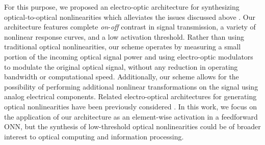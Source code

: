 For this purpose, we proposed an electro-optic architecture for synthesizing optical-to-optical nonlinearities which alleviates the issues discussed above \cite{williamson_reprogrammable_2019}. 
Our architecture features complete \textit{on}-\textit{off} contrast in signal transmission, a variety of nonlinear response curves, and a low activation threshold. 
Rather than using traditional optical nonlinearities, our scheme operates by measuring a small portion of the incoming optical signal power and using electro-optic modulators to modulate the original optical signal, without any reduction in operating bandwidth or computational speed. 
Additionally, our scheme allows for the possibility of performing additional nonlinear transformations on the signal using analog electrical components. 
Related electro-optical architectures for generating optical nonlinearities have been previously considered \cite{lentine_evolution_1993, majumdar_cavityenabled_2014, tait_silicon_2018}. 
In this work, we focus on the application of our architecture as an element-wise activation in a feedforward ONN, but the synthesis of low-threshold optical nonlinearities could be of broader interest to optical computing and information processing.


